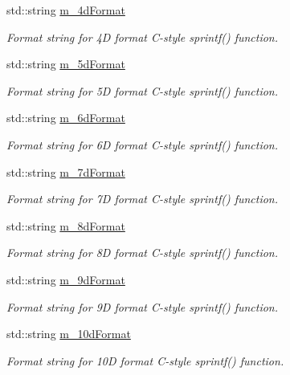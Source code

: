 \begin{DoxyCompactItemize}
std\+::string \hyperlink{classns3_1_1FileHelper_aaec049f83d5aeac80beb62b6e3b2816d}{m\+\_\+4d\+Format}
\begin{DoxyCompactList}\small\item\em Format string for 4D format C-\/style sprintf() function. \end{DoxyCompactList}\item 
std\+::string \hyperlink{classns3_1_1FileHelper_ace51d3b3bb8e63f4f3c24f6571fb6d48}{m\+\_\+5d\+Format}
\begin{DoxyCompactList}\small\item\em Format string for 5D format C-\/style sprintf() function. \end{DoxyCompactList}\item 
std\+::string \hyperlink{classns3_1_1FileHelper_a1860865352c871c58f975912183da7b7}{m\+\_\+6d\+Format}
\begin{DoxyCompactList}\small\item\em Format string for 6D format C-\/style sprintf() function. \end{DoxyCompactList}\item 
std\+::string \hyperlink{classns3_1_1FileHelper_aaff51b04dbf06ddc23168385b95569c0}{m\+\_\+7d\+Format}
\begin{DoxyCompactList}\small\item\em Format string for 7D format C-\/style sprintf() function. \end{DoxyCompactList}\item 
std\+::string \hyperlink{classns3_1_1FileHelper_a66d2e37f20396ac2b698918ef13f865f}{m\+\_\+8d\+Format}
\begin{DoxyCompactList}\small\item\em Format string for 8D format C-\/style sprintf() function. \end{DoxyCompactList}\item 
std\+::string \hyperlink{classns3_1_1FileHelper_a672359899beed72cb7aee27809672905}{m\+\_\+9d\+Format}
\begin{DoxyCompactList}\small\item\em Format string for 9D format C-\/style sprintf() function. \end{DoxyCompactList}\item 
std\+::string \hyperlink{classns3_1_1FileHelper_a9f89d2419c3ae173761942996aa61247}{m\+\_\+10d\+Format}
\begin{DoxyCompactList}\small\item\em Format string for 10D format C-\/style sprintf() function. \end{DoxyCompactList}\end{DoxyCompactItemize}


